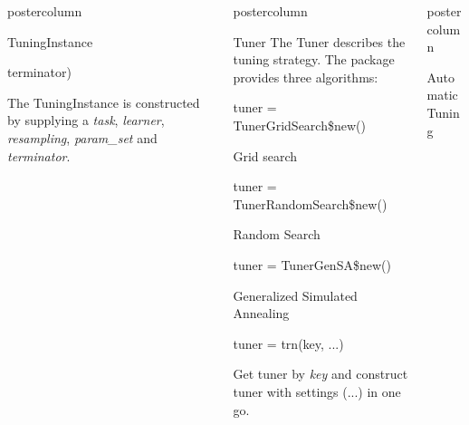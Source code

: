 \documentclass{beamer}
\newlength{\columnheight} %
\begin{document}
\begin{frame}[fragile]{}
\begin{columns}
\begin{column}{.245\textwidth}
\begin{beamercolorbox}[center]{postercolumn}
\begin{minipage}{.98\textwidth}
{\begin{myblock}{TuningInstance}
\begin{codeboxmultiline}[width=18cm]
							\hspace*{1ex}terminator)
						\end{codeboxmultiline}
						The TuningInstance is constructed by supplying a \textit{task}, \textit{learner}, \textit{resampling}, \textit{param\_set} and \textit{terminator}. 
						\\
					\end{myblock}	
					\vfill}
				\end{minipage}
			\end{beamercolorbox}
		\end{column}
		\begin{column}{.245\textwidth}
			\begin{beamercolorbox}[center]{postercolumn}
				\begin{minipage}{.98\textwidth}
					\parbox[t][\columnheight]{\textwidth}{
						\begin{myblock}{Tuner}
							The Tuner describes the tuning strategy. The package provides three algorithms:
							\\
							\begin{codebox}
								tuner = TunerGridSearch\$new()
							\end{codebox}
							Grid search
							\\
							\begin{codebox}
								tuner = TunerRandomSearch\$new()
							\end{codebox}
							Random Search
							\\
							\begin{codebox}
								tuner = TunerGenSA\$new()
							\end{codebox}
							Generalized Simulated Annealing
							\\
							\begin{codebox}
								tuner = trn(key, ...)
							\end{codebox}
							Get tuner by \textit{key} and construct tuner with settings (...) in one go.
						\end{myblock}
					\vfill}
				\end{minipage}
			\end{beamercolorbox}
		\end{column}
		\begin{column}{.245\textwidth}
			\begin{beamercolorbox}[center]{postercolumn}
				\begin{minipage}{.98\textwidth}
					\parbox[t][\columnheight]{\textwidth}{
						\begin{myblock}{Automatic Tuning}

\end{myblock}}
\end{minipage}
\end{beamercolorbox}
\end{column}
\end{columns}
\end{frame}
\end{document}
